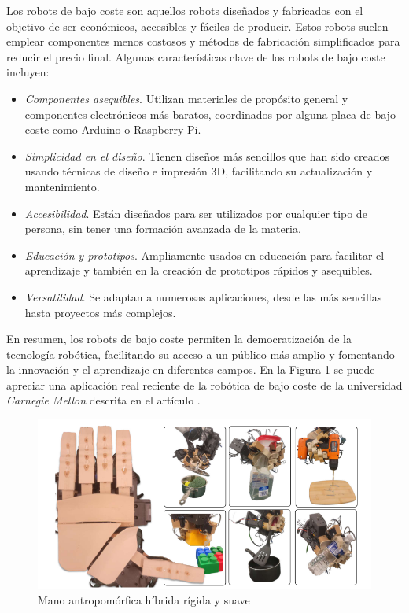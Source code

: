 Los robots de bajo coste son aquellos robots diseñados y fabricados con el objetivo de ser económicos, accesibles y fáciles de producir. Estos robots suelen emplear componentes menos costosos y métodos de fabricación simplificados para reducir el precio final. Algunas características clave de los robots de bajo coste incluyen:

\begin{itemize}
	\item \textit{Componentes asequibles}. Utilizan materiales de propósito general y componentes electrónicos más baratos, coordinados por alguna placa de bajo coste como Arduino o Raspberry Pi.
	\item \textit{Simplicidad en el diseño}. Tienen diseños más sencillos que han sido creados usando técnicas de diseño e impresión 3D, facilitando su actualización y mantenimiento.
	\item \textit{Accesibilidad}. Están diseñados para ser utilizados por cualquier tipo de persona, sin tener una formación avanzada de la materia.
	\item \textit{Educación y prototipos}. Ampliamente usados en educación para facilitar el aprendizaje y también en la creación de prototipos rápidos y asequibles.
	\item \textit{Versatilidad}. Se adaptan a numerosas aplicaciones, desde las más sencillas hasta proyectos más complejos.
	
\end{itemize}


En resumen, los robots de bajo coste permiten la democratización de la tecnología robótica, facilitando su acceso a un público más amplio y fomentando la innovación y el aprendizaje en diferentes campos. En la Figura \ref{fig:roblowcost} se puede apreciar una aplicación real reciente de la robótica de bajo coste de la universidad \textit{Carnegie Mellon} descrita en el artículo \cite{shaw2024leap}.

\begin{figure} [h!]
	\begin{center}
		\includegraphics[width=16cm]{figs/handlowcost.png}
	\end{center}
	\caption{Mano antropomórfica híbrida rígida y suave} %
	\label{fig:roblowcost}
\end{figure}

